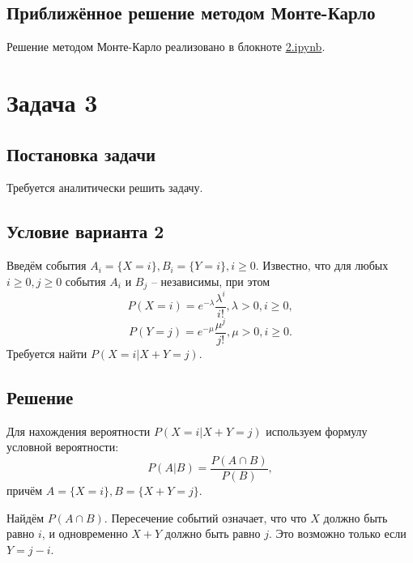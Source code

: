 \documentclass[a4paper,14pt]{extarticle}
\begin{document}
        \subsection*{Приближённое решение методом Монте-Карло}
            Решение методом Монте-Карло реализовано в блокноте \href{https://github.com/vorandpav/TVIPS}{2.ipynb}.


            
    
    
    \section*{Задача 3}
        
        \subsection*{Постановка задачи}
            
            Требуется аналитически решить задачу.
        
        \subsection*{Условие варианта 2}
            
            Введём события \( A_i = \{X = i\}, B_i = \{Y = i\}, i \geq 0 \). Известно, что для любых \( i \geq 0, j \geq 0 \) события \( A_i \) и \( B_j \) -- независимы, при этом
            \[ P(X = i) = e^{-\lambda} \frac{\lambda^i}{i!}, \lambda > 0, i \geq 0, \]
            \[ P(Y = j) = e^{-\mu} \frac{\mu^j}{j!}, \mu > 0, i \geq 0. \]
            Требуется найти \( P(X = i | X + Y = j) \).
        
        \subsection*{Решение}
            
            Для нахождения вероятности \( P(X = i | X + Y = j) \) используем формулу условной вероятности:
            \[ P(A|B) = \frac{P( A \cap B)}{P(B)}, \]
            причём \(A = \{X = i\}, B = \{X + Y = j\}\).
            
            Найдём \(P( A \cap B)\). Пересечение событий означает, что что \(X\) должно быть равно \(i\), и одновременно \(X+Y\) должно быть равно \(j\). Это возможно только если \(Y=j-i\).
            
\end{document}

